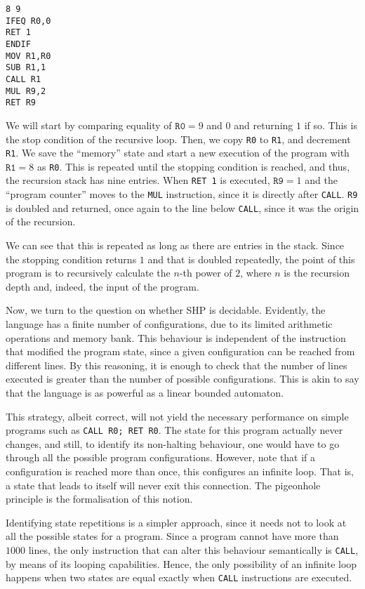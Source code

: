 \documentclass[12pt]{article}
\begin{document}
{\footnotesize
\begin{verbatim}
8 9
IFEQ R0,0
RET 1
ENDIF
MOV R1,R0
SUB R1,1
CALL R1
MUL R9,2
RET R9
\end{verbatim}}

We will start by comparing equality of $\texttt{R0} = 9$ and $0$ and returning $1$ if so. This is the stop condition of the recursive loop. Then, we copy \texttt{R0} to \texttt{R1}, and decrement \texttt{R1}. We save the ``memory'' state and start a new execution of the program with $\texttt{R1} = 8$ as \texttt{R0}. This is repeated until the stopping condition is reached, and thus, the recursion stack has nine entries. When \texttt{RET 1} is executed, $\texttt{R9} = 1$ and the ``program counter'' moves to the \texttt{MUL} instruction, since it is directly after \texttt{CALL}. \texttt{R9} is doubled and returned, once again to the line below \texttt{CALL}, since it was the origin of the recursion. 

We can see that this is repeated as long as there are entries in the stack. Since the stopping condition returns $1$ and that is doubled repeatedly, the point of this program is to recursively calculate the $n$-th power of $2$, where $n$ is the recursion depth and, indeed, the input of the program.

Now, we turn to the question on whether SHP is decidable. Evidently, the language has a finite number of configurations, due to its limited arithmetic operations and memory bank. This behaviour is independent of the instruction that modified the program state, since a given configuration can be reached from different lines. By this reasoning, it is enough to check that the number of lines executed is greater than the number of possible configurations. This is akin to say that the language is as powerful as a linear bounded automaton.

This strategy, albeit correct, will not yield the necessary performance on simple programs such as \texttt{CALL R0; RET R0}. The state for this program actually never changes, and still, to identify its non-halting behaviour, one would have to go through all the possible program configurations. However, note that if a configuration is reached more than once, this configures an infinite loop. That is, a state that leads to itself will never exit this connection. The pigeonhole principle is the formalisation of this notion. 

Identifying state repetitions is a simpler approach, since it needs not to look at all the possible states for a program. Since a program cannot have more than $1000$ lines, the only instruction that can alter this behaviour semantically is \texttt{CALL}, by means of its looping capabilities. Hence, the only possibility of an infinite loop happens when two states are equal exactly when \texttt{CALL} instructions are executed. 
\end{document}
